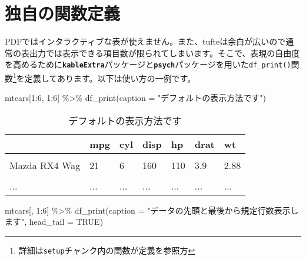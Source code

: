 \documentclass[a4paper,14pt]{tufte-handout}
\newenvironment{Shaded}{}{}
\newcommand{\AttributeTok}[1]{\textcolor[rgb]{0.49,0.56,0.16}{#1}}
\newcommand{\ConstantTok}[1]{\textcolor[rgb]{0.53,0.00,0.00}{#1}}
\newcommand{\DecValTok}[1]{\textcolor[rgb]{0.25,0.63,0.44}{#1}}
\newcommand{\FunctionTok}[1]{\textcolor[rgb]{0.02,0.16,0.49}{#1}}
\newcommand{\NormalTok}[1]{#1}
\newcommand{\SpecialCharTok}[1]{\textcolor[rgb]{0.25,0.44,0.63}{#1}}
\newcommand{\StringTok}[1]{\textcolor[rgb]{0.25,0.44,0.63}{#1}}
\begin{document}
\newpage

\hypertarget{ux72ecux81eaux306eux95a2ux6570ux5b9aux7fa9}{%
\section{独自の関数定義}\label{ux72ecux81eaux306eux95a2ux6570ux5b9aux7fa9}}

PDFではインタラクティブな表が使えません。また、tufteは余白が広いので通常の表出力では表示できる項目数が限られてしまいます。そこで、表現の自由度を高めるために\textbf{\texttt{kableExtra}}パッケージと\textbf{\texttt{psych}}パッケージを用いた\texttt{df\_print()}関数\footnote{詳細は\texttt{setup}チャンク内の関数が定義を参照方}を定義してあります。以下は使い方の一例です。

\begin{Shaded}
\begin{Highlighting}[numbers=left,,]
\NormalTok{mtcars[}\DecValTok{1}\SpecialCharTok{:}\DecValTok{6}\NormalTok{, }\DecValTok{1}\SpecialCharTok{:}\DecValTok{6}\NormalTok{] }\SpecialCharTok{\%\textgreater{}\%} 
  \FunctionTok{df\_print}\NormalTok{(}\AttributeTok{caption =} \StringTok{"デフォルトの表示方法です"}\NormalTok{)}
\end{Highlighting}
\end{Shaded}

\begin{table}

\caption{\label{tab:unnamed-chunk-1}デフォルトの表示方法です}
\centering
\begin{tabular}[t]{lllllll}
\toprule
  & mpg & cyl & disp & hp & drat & wt\\
\midrule
\cellcolor{gray!6}{Mazda RX4} & \cellcolor{gray!6}{21} & \cellcolor{gray!6}{6} & \cellcolor{gray!6}{160} & \cellcolor{gray!6}{110} & \cellcolor{gray!6}{3.9} & \cellcolor{gray!6}{2.62}\\
Mazda RX4 Wag & 21 & 6 & 160 & 110 & 3.9 & 2.88\\
\cellcolor{gray!6}{Datsun 710} & \cellcolor{gray!6}{22.8} & \cellcolor{gray!6}{4} & \cellcolor{gray!6}{108} & \cellcolor{gray!6}{93} & \cellcolor{gray!6}{3.85} & \cellcolor{gray!6}{2.32}\\
... & ... & ... & ... & ... & ... & ...\\
\bottomrule
\end{tabular}
\end{table}

\begin{Shaded}
\begin{Highlighting}[numbers=left,,]
\NormalTok{mtcars[, }\DecValTok{1}\SpecialCharTok{:}\DecValTok{6}\NormalTok{] }\SpecialCharTok{\%\textgreater{}\%} 
  \FunctionTok{df\_print}\NormalTok{(}\AttributeTok{caption =} \StringTok{"データの先頭と最後から規定行数表示します"}\NormalTok{,}
           \AttributeTok{head\_tail =} \ConstantTok{TRUE}\NormalTok{)}
\end{Highlighting}
\end{Shaded}
\end{document}
